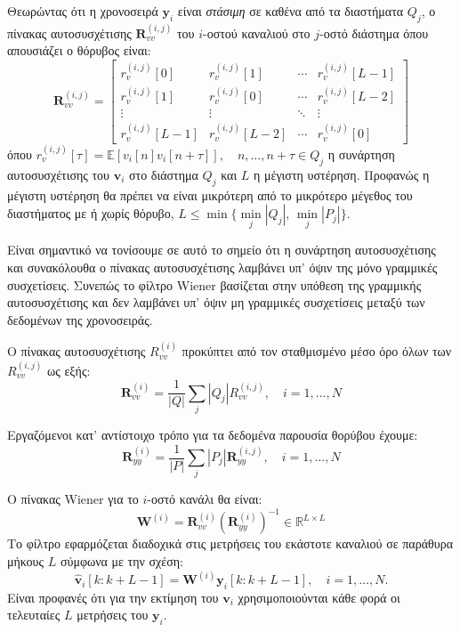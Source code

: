 \documentclass[a4paper,12pt]{article}
\begin{document}
Θεωρώντας ότι η χρονοσειρά $\mathbf{y}_i$ είναι \textit{στάσιμη} σε καθένα από τα διαστήματα $Q_j$, ο πίνακας
αυτοσυσχέτισης $\mathbf{R}_{vv}^{(i,j)}$ του $i$-οστού καναλιού στο $j$-οστό διάστημα όπου απουσιάζει ο 
θόρυβος είναι:
\[
    \mathbf{R}_{vv}^{(i,j)} = 
    \begin{bmatrix}
    r_v^{(i,j)}[0] & r_v^{(i,j)}[1] & \cdots & r_v^{(i,j)}[L-1] \\
    r_v^{(i,j)}[1] & r_v^{(i,j)}[0] & \cdots & r_v^{(i,j)}[L-2] \\
    \vdots & \vdots & \ddots & \vdots \\
    r_v^{(i,j)}[L-1] & r_v^{(i,j)}[L-2] & \cdots & r_v^{(i,j)}[0]
    \end{bmatrix}
\]
όπου $r_v^{(i,j)}[\tau] = \mathbb{E}[v_i[n]v_i[n + \tau]], \quad n,\ldots, n + \tau \in Q_j$ η συνάρτηση 
αυτοσυσχέτισης του $\mathbf{v}_i$ στο διάστημα $Q_j$ και $L$ η μέγιστη υστέρηση. Προφανώς η μέγιστη υστέρηση 
θα πρέπει να είναι μικρότερη από το μικρότερο μέγεθος του διαστήματος με ή χωρίς θόρυβο, 
$L \leq \min\{\underset{j}{\min}|Q_j|, \, \underset{j}{\min}|P_j|\}$.

Είναι σημαντικό να τονίσουμε σε αυτό το σημείο ότι η συνάρτηση αυτοσυσχέτισης και συνακόλουθα ο πίνακας
αυτοσυσχέτισης λαμβάνει υπ' όψιν της μόνο γραμμικές συσχετίσεις. Συνεπώς το φίλτρο 
Wiener βασίζεται στην υπόθεση της γραμμικής αυτοσυσχέτισης
και δεν λαμβάνει υπ' όψιν μη γραμμικές συσχετίσεις μεταξύ των δεδομένων της χρονοσειράς.

Ο πίνακας αυτοσυσχέτισης $R_{vv}^{(i)}$ προκύπτει από τον σταθμισμένο μέσο όρο όλων των $R_{vv}^{(i,j)}$ 
ως εξής:
\[
\mathbf{R}_{vv}^{(i)} = \frac{1}{|Q|}\sum_{j}|Q_j|R_{vv}^{(i,j)}, \quad i=1,\ldots,N
\]

Εργαζόμενοι κατ' αντίστοιχο τρόπο για τα δεδομένα παρουσία θορύβου έχουμε:
\[
\mathbf{R}_{yy}^{(i)} = \frac{1}{|P|}\sum_{j}|P_j|\mathbf{R}_{yy}^{(i,j)}, \quad i=1,\ldots,N
\]

Ο πίνακας Wiener για το $i$-οστό κανάλι θα είναι:
\[
\mathbf{W}^{(i)} = \mathbf{R}_{vv}^{(i)}\left(\mathbf{R}_{yy}^{(i)}\right)^{-1} \in \mathbb{R}^{L \times L}
\]
Το φίλτρο εφαρμόζεται διαδοχικά στις μετρήσεις του εκάστοτε καναλιού σε παράθυρα μήκους $L$ σύμφωνα με την
σχέση:
\[
\hat{\mathbf{v}}_i[k:k+L-1] = \mathbf{W}^{(i)}\mathbf{y}_i[k:k+L-1], \quad i = 1,\ldots,N.
\] 
Είναι προφανές ότι για την εκτίμηση του $\mathbf{v}_i$ χρησιμοποιούνται κάθε φορά οι τελευταίες $L$
μετρήσεις του $\mathbf{y}_i$.
\end{document}
